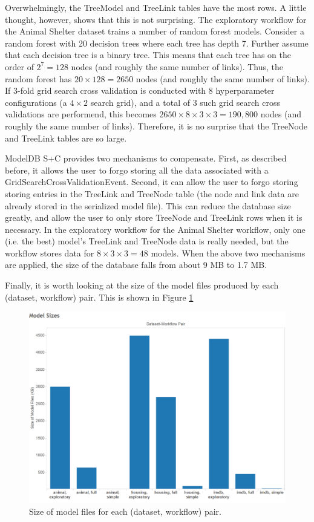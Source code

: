 Overwhelmingly, the TreeModel and TreeLink tables have the most rows. A little
thought, however, shows that this is not surprising. The exploratory workflow
for the Animal Shelter dataset trains a number of random forest models. Consider
a random forest with 20 decision trees where each tree has depth 7. Further assume
that each decision tree is a binary tree. This means that each tree has on the
order of $2^{7} = 128$ nodes (and roughly the same number of links). Thus, the
random forest has $20 \times 128 = 2650$ nodes (and roughly the same number of links).
If 3-fold grid search cross validation is conducted with 8 hyperparameter configurations (a $4 \times 2$ 
search grid), and a total of 3 such grid search cross validations are performend, 
this becomes $2650 \times 8 \times 3 \times 3 = 190,800$ nodes (and roughly the same number of links).
Therefore, it is no surprise that the TreeNode and TreeLink tables are so large.

ModelDB S+C provides two mechanisms to compensate. First, as described before, it
allows the user to forgo storing all the data associated with a GridSearchCrossValidationEvent.
Second, it can allow the user to forgo storing storing entries in the TreeLink and TreeNode table (the
node and link data are already stored in the serialized model file). This can reduce the database size
greatly, and allow the user to only store TreeNode and TreeLink rows when it is necessary. In the 
exploratory workflow for the Animal Shelter workflow, only one (i.e. the best)  model's TreeLink and TreeNode data is really needed,
but the workflow stores data for $8 \times 3 \times 3 = 48$ models. When the above two mechanisms are applied,
the size of the database falls from about 9 MB to 1.7 MB. 

Finally, it is worth looking at the size of the model files produced by each (dataset, workflow) pair. This is shown in
Figure \ref{fig:modelsizes}

\begin{figure}
  \centering
  \includegraphics[width=5.0in]{modelsizes}
  \caption{
    Size of model files for each (dataset, workflow) pair.
  }
  \label{fig:modelsizes}
\end{figure}

